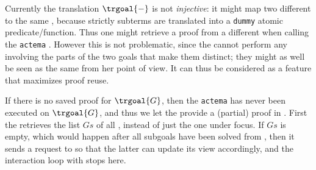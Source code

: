 \begin{remark}
  Currently the translation $\trgoal{-}$ is not \emph{injective}: it might
  map two different   to the same  ,
  because strictly  subterms are translated into a
  \texttt{dummy} atomic predicate/function. Thus one might retrieve a proof from
  a different  when calling the \texttt{actema} . However
  this is not problematic, since the  cannot perform any 
  involving the parts of the two goals that make them distinct; they might as
  well be seen as the same  from her point of view. It can thus be
  considered as a feature that maximizes proof reuse.
\end{remark}

If there is no saved proof for $\trgoal{G}$, then the \texttt{actema}
 has never been executed on $\trgoal{G}$, and thus we let the
 provide a (partial) proof in . First the
 retrieves the list $Gs$ of all , instead of just
the one under focus. If $Gs$ is empty, which would happen after all subgoals
have been solved from , then it sends a  request to
 so that the latter can update its view accordingly, and the
interaction loop with  stops here.

